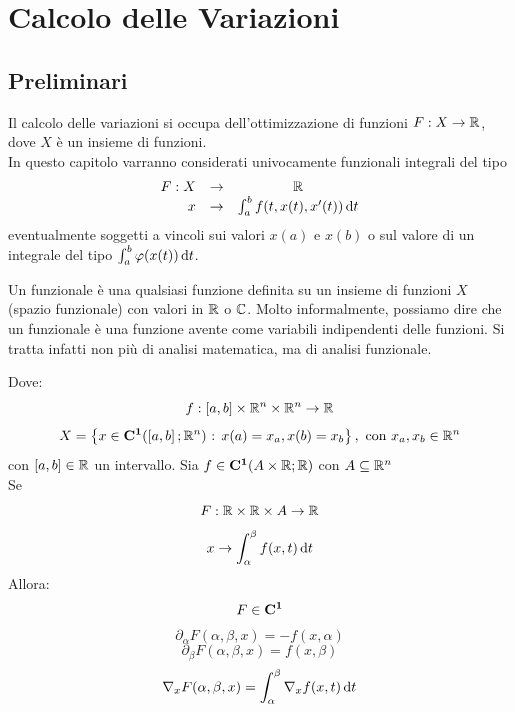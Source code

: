 \chapter{Calcolo delle Variazioni}
\section{Preliminari}
Il calcolo delle variazioni si occupa dell'ottimizzazione di funzioni $ F : X \to \mathbb{R} $, dove $X$ è un insieme di funzioni.\\
In questo capitolo varranno considerati univocamente funzionali integrali del tipo
\[
	\begin{array}{rcc}
		F: X & \to & \mathbb{R} \\
		x & \to & \int_{a}^b f(t,x(t), x'(t))\,\mathrm{d}{t}
	\end{array}
\]
eventualmente soggetti a vincoli sui valori $x(a)$ e $x(b)$ o sul valore di un integrale del tipo $\int_a^b \varphi(x(t))\,\mathrm{d}{t}$.\\
\begin{note}
	Un funzionale è una qualsiasi funzione definita su un insieme di funzioni $ X $ (spazio funzionale) con valori in $ \mathbb{R} $ o $ \mathbb{C} $.
	Molto informalmente, possiamo dire che un funzionale è una funzione avente come variabili indipendenti delle funzioni.
	Si tratta infatti non più di analisi matematica, ma di analisi funzionale.
\end{note}
Dove:
\[f: \left[a,b\right]\times \mathbb{R} ^n\times \mathbb{R} ^n \to \mathbb{R}\]
\[X=\left\{x\in \mathbf{C^{1}}(\left[a,b\right]; \mathbb{R}^n)\text{ : }x(a)=x_a, x(b)=x_b \right\},\text{ con }x_a,x_b\in \mathbb{R} ^n\]
con $ \left[a,b\right] \in \mathbb{R} $ un intervallo.
\proposition
Sia $f\in \mathbf{C^{1}}(A\times \mathbb{R} ; \mathbb{R} )$ con $A \subseteq \mathbb{R} ^n$\\
Se
\[ F: \mathbb{R} \times \mathbb{R} \times A \to \mathbb{R} \]
\[ x \to \int_{\alpha}^\beta f(x,t)\,\mathrm{d}{t} \]
Allora:
\[ F\in \mathbf{C^{1}}\]
\[ \partial_\alpha F(\alpha,\beta,x)=-f(x,\alpha)\]
\[ \partial_\beta F(\alpha,\beta,x)=f(x,\beta)\]
\[ \nabla_x F(\alpha,\beta,x)=\int_{\alpha}^{\beta}\nabla_xf(x,t)\,\mathrm{d}{t}\]
